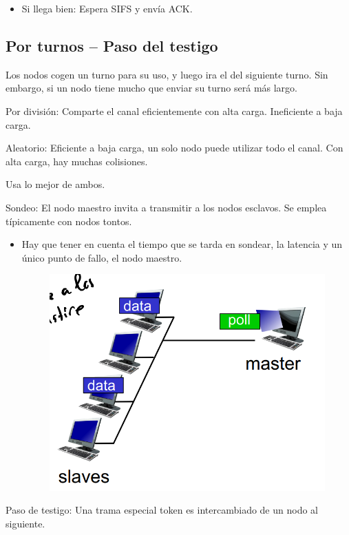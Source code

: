 \documentclass[12pt, twoside, openright]{report} %
\begin{document}
\begin{itemize}
\begin{itemize}
		            \begin{itemize}
			            \item Si llega bien: Espera SIFS y envía ACK.
		            \end{itemize}
	      \end{itemize}
\end{itemize}


\subsection{Por turnos -- Paso del testigo} Los nodos cogen un turno para su
uso, y luego ira el del siguiente turno. Sin embargo, si un nodo
tiene mucho que enviar su turno será más largo.



Por división: Comparte el canal eficientemente con alta carga.
Ineficiente a baja carga.

Aleatorio: Eficiente a baja carga, un solo nodo puede utilizar
todo el canal. Con alta carga, hay muchas colisiones.

Usa lo mejor de ambos.

Sondeo: El nodo maestro invita a transmitir a los nodos
esclavos. Se emplea típicamente con nodos tontos.

\begin{itemize}
	\item Hay que tener en cuenta el tiempo que se tarda en sondear, la
	      latencia y un único punto de fallo, el nodo maestro.
	      \begin{figure}[H]
		      {\includegraphics[scale=.25]{Untitled 55.png}}
	      \end{figure}
\end{itemize}
\pagebreak
Paso de testigo: Una trama especial token es intercambiado de un
nodo al siguiente.
\end{document}
